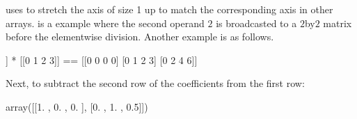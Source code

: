 \documentclass[letterpaper,10pt,english]{sphinxmanual}
\begin{document}
 uses  to stretch the axis of size 1 up to match the corresponding axis in other arrays. is a example where the second operand \(2\) is broadcasted to a \(2\)\sphinxhyphen{}by\sphinxhyphen{}\(2\) matrix before the elementwise division. Another example is as follows.

\begin{sphinxVerbatim}[commandchars=\\\{\}]
  
  
  
\end{sphinxVerbatim}

\begin{sphinxVerbatim}[commandchars=\\\{\}]
[[0]
 [1]
 [2]]
*
[[0 1 2 3]]
==
[[0 0 0 0]
 [0 1 2 3]
 [0 2 4 6]]
\end{sphinxVerbatim}

Next, to subtract the second row of the coefficients from the first row:

\begin{sphinxVerbatim}[commandchars=\\\{\}]
\PYG{p}{[}\PYG{p}{]}  \PYG{p}{[}\PYG{p}{]}  \PYG{p}{[}\PYG{p}{]}
\end{sphinxVerbatim}

\begin{sphinxVerbatim}[commandchars=\\\{\}]
array([[1. , 0. , 0. ],
       [0. , 1. , 0.5]])
\end{sphinxVerbatim}
\end{document}
